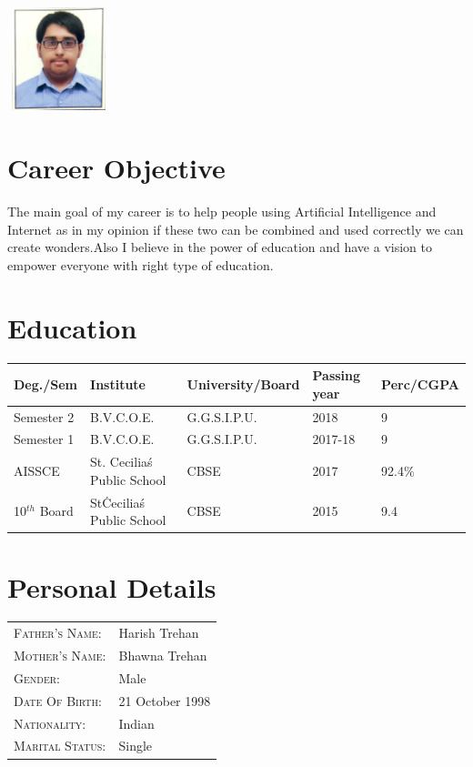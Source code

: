 \documentclass{my_cv}
\begin{document}
	
	\begin{center}
		\includegraphics[width=3cm, height=3cm]{Anuj.jpg}\\
	\end{center}
	
	
	\section{Career Objective}
	
	The main goal of my career is to help people using Artificial Intelligence and Internet as in my opinion if these two can be combined and used correctly we can create wonders.Also I believe in the power of education and have a vision to empower everyone with right type of education.
	
	\section{Education}
	
	\begin{tabular}{|l|l|l|l|l|}
		\hline
		Deg./Sem & Institute & University/Board & Passing year & Perc/CGPA \\
		\hline
		Semester 2 & B.V.C.O.E. & G.G.S.I.P.U. & 2018 & 9 \\
		\hline
		Semester 1 & B.V.C.O.E. & G.G.S.I.P.U. & 2017-18 & 9 \\
		\hline
		AISSCE & St. Cecilia\'s Public School & CBSE & 2017 & 92.4\%  \\
		\hline
		
		10$^{th}$ Board & St\. Cecilia\'s Public School & CBSE & 2015 & 9.4  \\
		\hline
	\end{tabular}
    \section{Personal Details}
    
    \begin{tabular}{ll}
    	\textsc{Father's Name:} & Harish Trehan \\
    	\textsc{Mother's Name:}       & Bhawna Trehan \\
    	\textsc{Gender:}         & Male \\
    	\textsc{Date Of Birth:}         & 21 October 1998 \\
    	\textsc{Nationality:}   & Indian \\
    	\textsc{Marital Status:} & Single \\
    \end{tabular}
	
\end{document}

